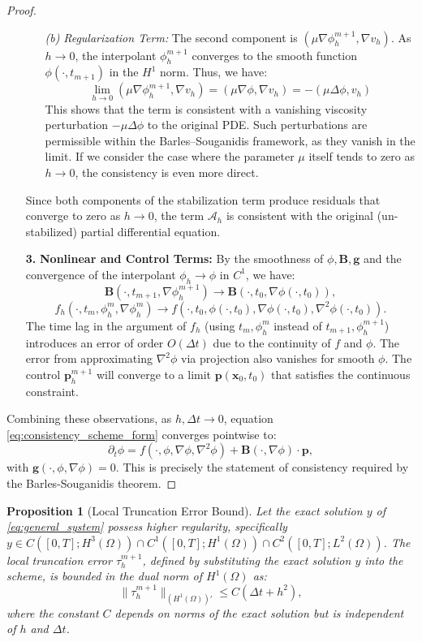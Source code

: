 \documentclass[pdflatex,sn-mathphys-num]{sn-jnl}%
\theoremstyle{thmstyleone}%
\newtheorem{prop}{Proposition}[section]
\numberwithin{equation}{section}
\begin{document}
\begin{proof}
\begin{enumerate}
\begin{itemize}
    \item[\emph{(b)}] \emph{Regularization Term:} The second component is $(\mu \nabla \phi_h^{m+1}, \nabla v_h)$. As $h \to 0$, the interpolant $\phi_h^{m+1}$ converges to the smooth function $\phi(\cdot, t_{m+1})$ in the $H^1$ norm. Thus, we have:
    $$
    \lim_{h \to 0} (\mu \nabla \phi_h^{m+1}, \nabla v_h) = (\mu \nabla \phi, \nabla v_h) = -(\mu \Delta \phi, v_h)
    $$
    This shows that the term is consistent with a vanishing viscosity perturbation $-\mu \Delta \phi$ to the original PDE. Such perturbations are permissible within the Barles--Souganidis framework, as they vanish in the limit. If we consider the case where the parameter $\mu$ itself tends to zero as $h \to 0$, the consistency is even more direct.
\end{itemize}
Since both components of the stabilization term produce residuals that converge to zero as $h \to 0$, the term $\mathcal{A}_h$ is consistent with the original (un-stabilized) partial differential equation.

    \item[\textbf{3.}] \textbf{Nonlinear and Control Terms:} By the smoothness of $\phi, \bm{B}, \bm{g}$ and the convergence of the interpolant $\phi_h \to \phi$ in $C^1$, we have:
    $$\bm{B}(\cdot, t_{m+1}, \nabla \phi_h^{m+1}) \to \bm{B}(\cdot, t_0, \nabla \phi(\cdot, t_0)),$$
    $$f_h(\cdot, t_m, \phi_h^m, \nabla \phi_h^m) \to f(\cdot, t_0, \phi(\cdot, t_0), \nabla \phi(\cdot, t_0), \nabla^2 \phi(\cdot, t_0)).$$
    The time lag in the argument of $f_h$ (using $t_m, \phi_h^m$ instead of $t_{m+1}, \phi_h^{m+1}$) introduces an error of order $O(\Delta t)$ due to the continuity of $f$ and $\phi$. The error from approximating $\nabla^2\phi$ via projection also vanishes for smooth $\phi$. The control $\bm{p}_h^{m+1}$ will converge to a limit $\bm{p}(\bm{x}_0, t_0)$ that satisfies the continuous constraint.
\end{enumerate}
Combining these observations, as $h, \Delta t \to 0$, equation \eqref{eq:consistency_scheme_form} converges pointwise to:
$$\partial_t \phi = f(\cdot, \phi, \nabla\phi, \nabla^2\phi) + \bm{B}(\cdot, \nabla\phi)\cdot\bm{p},$$
with $\bm{g}(\cdot, \phi, \nabla\phi) = 0$. This is precisely the statement of consistency required by the Barles-Souganidis theorem.
\end{proof}

\begin{prop}[Local Truncation Error Bound]
\label{prop:strong_truncation_error}
Let the exact solution $y$ of \eqref{eq:general_system} possess higher regularity, specifically $y \in C([0,T]; H^{3}(\Omega)) \cap C^1([0,T]; H^1(\Omega)) \cap C^2([0,T]; L^2(\Omega))$. The local truncation error $\tau_h^{m+1}$, defined by substituting the exact solution $y$ into the scheme, is bounded in the dual norm of $H^1(\Omega)$ as:
$$ \| \tau_h^{m+1} \|_{(H^1(\Omega))'} \leq C (\Delta t + h^2), $$
where the constant $C$ depends on norms of the exact solution but is independent of $h$ and $\Delta t$.
\end{prop}
\end{document}
